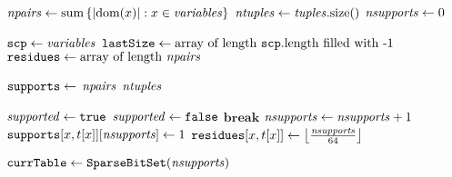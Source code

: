       \STATE $\mathit{npairs} \leftarrow \mathrm{sum}\left\{|\text{dom}({x})| : x \in \mathit{variables}\right\}$
      \label{line:init:3}
      \STATE $\mathit{ntuples} \leftarrow \mathit{tuples}.\mathrm{size}()$ 
      \STATE $\mathit{nsupports} \leftarrow 0$  \label{line:init:4}
      
      \STATE $\texttt{scp} \leftarrow \mathit{variables}$ \label{line:init:1}
      \STATE $\texttt{lastSize} \leftarrow \text{array of  length~} \texttt{scp}.\mathrm{length}
      ~\text{filled with -1}$  \label{line:init:2}
      \STATE $\texttt{residues} \leftarrow \text{array of length~} \mathit{npairs}$ \label{line:init:9}
      
      \STATE $\texttt{supports} \leftarrow$ $\mathit{npairs}$
      $\mathit{ntuples}$ \label{line:init:5}

       \label{line:init:6}
        \STATE $\mathit{supported} \leftarrow \texttt{true}$
            \STATE $\mathit{supported} \leftarrow \texttt{false}$
            \STATE $\textbf{break}$ 
          \ENDIF
        \ENDFOREACH
            \STATE $\mathit{nsupports} \leftarrow \mathit{nsupports} + 1$
             \label{line:init:9}
              \STATE $\texttt{supports}[x,t[x]][\mathit{nsupports}] \leftarrow 1$ \label{line:init:10}
              \STATE $\texttt{residues}[x,t[x]] \leftarrow \left\lfloor\frac{\mathit{nsupports}}{64}\right\rfloor$
              \label{line:init:11}
            \ENDFOREACH
          \ENDIF
      \ENDFOREACH \label{line:init:7}

       \label{line:init:12}
          \label{line:init:14}
      \ENDFOREACH
      \STATE $\texttt{currTable} \leftarrow \texttt{SparseBitSet}(\mathit{nsupports})$ 
       \label{line:init:15}
      \Endfunc
